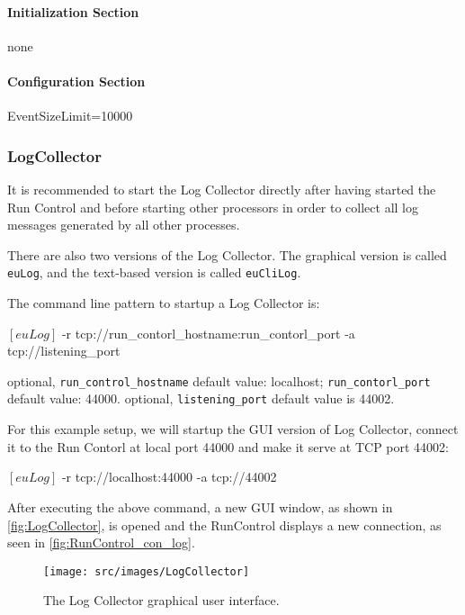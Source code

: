 \paragraph{Initialization Section}
none

\paragraph{Configuration Section}
\begin{listing}[conf]
[RunControl]
EventSizeLimit=10000
\end{listing}

\subsubsection{LogCollector}
\label{sec:logcollector}
It is recommended to start the Log Collector directly after having started the Run Control and before starting other processors in order to collect all log messages generated by all other processes.

There are also two versions of the Log Collector.
The graphical version is called \texttt{euLog},
and the text-based version is called \texttt{euCliLog}.

The command line pattern to startup a Log Collector is:
\begin{listing}[mybash]
$[euLog]$ -r tcp://{run_contorl_hostname}:{run_contorl_port} -a tcp://{listening_port}
\end{listing}

\begin{description}
optional, \texttt{run\_control\_hostname} default value: localhost;  \texttt{run\_contorl\_port}  default value: 44000.
optional, \texttt{listening\_port} default value is 44002.
\end{description}

For this example setup, we will startup the GUI version of Log Collector, connect it to the Run Contorl at local port 44000 and make it serve at TCP port 44002:\\
\begin{listing}[mybash]
$[euLog]$ -r tcp://localhost:44000 -a tcp://44002
\end{listing}

After executing the above command, a new GUI window, as shown in \autoref{fig:LogCollector}, is opened and the RunControl displays a new connection, as seen in \autoref{fig:RunControl_con_log}.
\begin{figure}[htb]
  \begin{center}
    \texttt{[image: src/images/LogCollector]}
    \caption{The Log Collector graphical user interface.}
    \label{fig:LogCollector}
  \end{center}
\end{figure}


